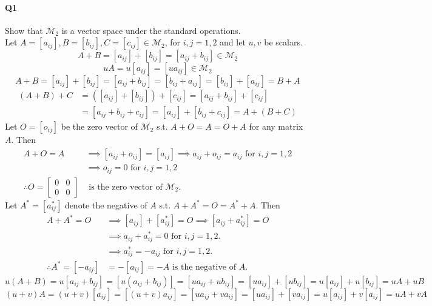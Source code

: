 \documentclass{report}
\begin{document}
\paragraph{Q1} Show that $\mathcal{M}_2$ is a vector space under the standard operations. \\

\noindent
Let $A = [a_{ij}], B = [b_{ij}], C = [c_{ij}] \in \mathcal{M}_2$, for $i, j = 1, 2$ and let $u, v$ be scalars. \\

\[ A + B = [a_{ij}] + [b_{ij}] = [a_{ij} + b_{ij}] \in \mathcal{M}_2\] %
\[ uA = u[a_{ij}] = [ua_{ij}] \in \mathcal{M}_2\] %
\[ A + B = [a_{ij}] + [b_{ij}] = [a_{ij} + b_{ij}] = [b_{ij} + a_{ij}] = [b_{ij}] + [a_{ij}] = B + A\] %
\begin{align*} 
(A + B) + C &= ([a_{ij}] + [b_{ij}]) + [c_{ij}] = [a_{ij} + b_{ij}] + [c_{ij}] \\ 
&= [a_{ij} + b_{ij} + c_{ij}] = [a_{ij}] + [b_{ij} + c_{ij}] = A + (B + C)
\end{align*} %
Let $O = [o_{ij}]$ be the zero vector of $\mathcal{M}_2$ s.t. $A + O = A = O + A$ for any matrix $A$.
Then
\begin{align*} 
A + O = A &\implies [a_{ij} + o_{ij}] = [a_{ij}] \implies a_{ij} + o_{ij} = a_{ij} \text{ for } i, j = 1, 2 \\
&\implies o_{ij} = 0 \text{ for } i, j = 1, 2 \\
\therefore O = \begin{bmatrix} 0 &0 \\ 0 &0 \end{bmatrix} &\text{ is the zero vector of } \mathcal{M}_2.
\end{align*} %
Let $A^* = [a^*_{ij}]$ denote the negative of $A$ s.t. $A + A^* = O = A^* + A$.
Then
\begin{align*}
A + A^* = O &\implies [a_{ij}] + [a^*_{ij}] = O \implies [a_{ij} + a^*_{ij}] = O \\ 
&\implies a_{ij} + a^*_{ij} = 0 \text{ for } i, j = 1, 2. \\
&\implies a^*_{ij} = -a_{ij} \text{ for } i, j = 1, 2. \\
\therefore A^* = [-a_{ij}] &= -[a_{ij}] = -A \text{ is the negative of } A.
\end{align*} %
\[ u(A+B) = u [a_{ij} + b_{ij}] = [u(a_{ij} + b_{ij})] = [ua_{ij} + ub_{ij}] = [ua_{ij}] + [ub_{ij}] = u[a_{ij}] + u[b_{ij}] = uA + uB\] %
\[(u+v)A = (u+v)[a_{ij}] = [(u+v)a_{ij}] = [ua_{ij} + va_{ij}] = [ua_{ij}] + [va_{ij}] = u[a_{ij}] + v[a_{ij}] = uA + vA\] %
\end{document}
